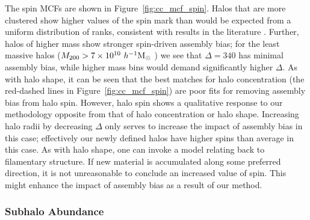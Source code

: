 \documentclass[usenatbib,fleqn]{mnras}
\begin{document}
The spin MCFs are shown in Figure~\ref{fig:cc_mcf_spin}. Halos that are more clustered show higher values of the spin mark than would be expected from a uniform distribution of ranks, consistent with results in the literature \citep{bett_etal07,faltenbacher_white10,lacerna_padilla12}. Further, halos of higher mass show stronger spin-driven assembly bias; for the least massive halos ($M_{200} > 7\times10^{10}\ h^{-1}\mathrm{M}_{\odot}~$) we see that $\Delta=340$ has minimal assembly bias, while higher mass bins would demand significantly higher $\Delta$. As with halo shape, it can be seen that the best matches for halo concentration (the red-dashed lines in Figure~\ref{fig:cc_mcf_spin}) are poor fits for removing assembly bias from halo spin.
 However, halo spin shows a qualitative response to our methodology opposite from that of halo concentration or halo shape. Increasing halo radii by decreasing $\Delta$ only serves to increase the impact of assembly bias in this case; effectively our newly defined halos have higher spins than average in this case. As with halo shape, one can invoke a model relating back to filamentary structure. If new material is accumulated along some preferred direction, it is not unreasonable to conclude an increased value of spin. This might enhance the impact of assembly bias as a result of our method.

\subsubsection{Subhalo Abundance}
\end{document}
